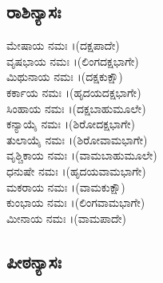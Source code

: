\subsection{ರಾಶಿನ್ಯಾಸಃ}
 
 ಮೇಷಾಯ ನಮಃ ।(ದಕ್ಷಪಾದೇ)\\
 ವೃಷಭಾಯ ನಮಃ ।(ಲಿಂಗದಕ್ಷಭಾಗೇ)\\
 ಮಿಥುನಾಯ ನಮಃ ।(ದಕ್ಷಕುಕ್ಷೌ)\\
 ಕರ್ಕಾಯ ನಮಃ ।(ಹೃದಯದಕ್ಷಭಾಗೇ)\\
 ಸಿಂಹಾಯ ನಮಃ ।(ದಕ್ಷಬಾಹುಮೂಲೇ)\\
 ಕನ್ಯಾಯೈ ನಮಃ ।(ಶಿರೋದಕ್ಷಭಾಗೇ)\\
 ತುಲಾಯೈ ನಮಃ ।(ಶಿರೋವಾಮಭಾಗೇ)\\
 ವೃಶ್ಚಿಕಾಯ ನಮಃ ।(ವಾಮಬಾಹುಮೂಲೇ)\\
 ಧನುಷೇ ನಮಃ ।(ಹೃದಯವಾಮಭಾಗೇ)\\
 ಮಕರಾಯ ನಮಃ ।(ವಾಮಕುಕ್ಷೌ)\\
 ಕುಂಭಾಯ ನಮಃ ।(ಲಿಂಗವಾಮಭಾಗೇ)\\
 ಮೀನಾಯ ನಮಃ ।(ವಾಮಪಾದೇ)
\subsection{ಪೀಠನ್ಯಾಸಃ}

